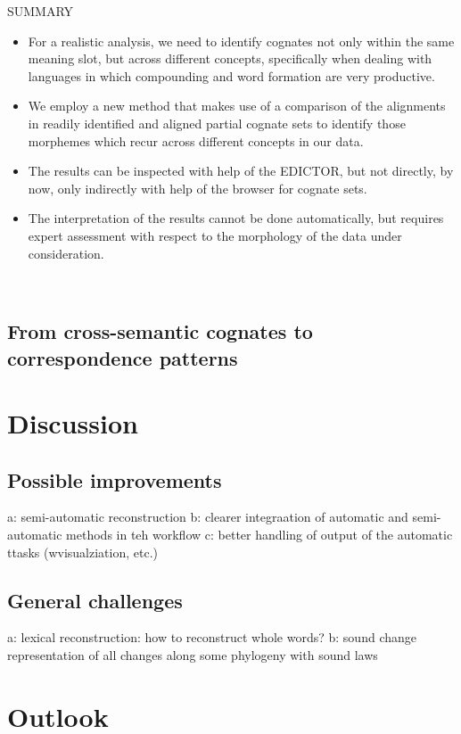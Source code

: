 \documentclass[xetex,svgnames]{scrartcl}
\begin{document}
\begin{center}
  \hline
  SUMMARY \\\hline
  \begin{itemize}
    \item For a realistic analysis, we need to identify cognates not only within the same meaning
      slot, but across different concepts, specifically when dealing with languages in which
      compounding and word formation are very productive.
    \item We employ a new method that makes use of a comparison of the alignments in readily
      identified and aligned partial cognate sets to identify those morphemes which recur across
      different concepts in our data.
    \item The results can be inspected with help of the EDICTOR, but not directly, by now, only
      indirectly with help of the browser for cognate sets.
    \item The interpretation of the results cannot be done automatically, but requires expert
      assessment with respect to the morphology of the data under consideration.
  \end{itemize}\\\hline
  \endtabular
\end{center}


\subsection{From cross-semantic cognates to correspondence patterns}

\section{Discussion}

\subsection{Possible improvements}

a: semi-automatic reconstruction
b: clearer integraation of automatic and semi-automatic methods in teh workflow
c: better handling of output of the automatic ttasks (wvisualziation, etc.)


\subsection{General challenges}

a: lexical reconstruction: how to reconstruct whole words?
b: sound change representation of all changes along some phylogeny with sound laws

\section{Outlook}




\nocite{List2019a}

\printbibliography
\end{document}
